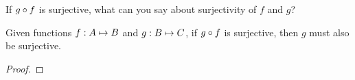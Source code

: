 \documentclass[main.tex]{subfiles}
\begin{document}
\subproblem{}\label{s2p4e}

If \({g} \circ{} {f}\) is surjective, what can you say about surjectivity of
\(f\) and \(g\)?

\begin{thm}
	Given functions \({f}: {A} \mapsto{} {B}\) and \({g}: {B} \mapsto{} {C}\), if
	\({g} \circ{} {f}\) is surjective, then \(g\) must also be surjective.
\end{thm}
\begin{proof}
	\todo{}
\end{proof}
\end{document}
